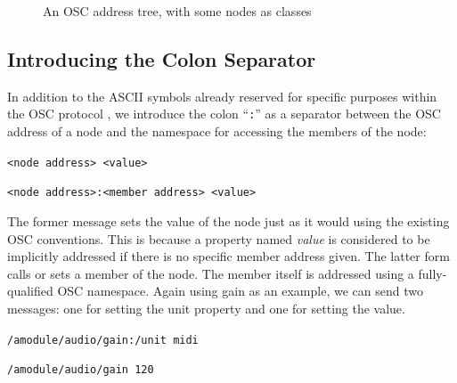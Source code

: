 \documentclass{NIME-alternate}
\begin{document}
\begin{figure}
\centerline{}
\caption{An OSC address tree, with some nodes as classes}
\label{fig:paths}
\end{figure}



\subsection{Introducing the Colon Separator} %
\label{sub:the_colon_separator}

In addition to the ASCII symbols already reserved for specific purposes within the OSC protocol \cite{Wright:1997}, we introduce the colon ``\texttt{:}'' as a separator between the OSC address of a node and the namespace for accessing the members of the node:

\texttt{<node address> <value>}

\texttt{<node address>:<member address> <value>}

The former message sets the value of the node just as it would using the existing OSC conventions. This is because a property named \emph{value} is considered to be implicitly addressed if there is no specific member address given. The latter form calls or sets a member of the node.  The member itself is addressed using a fully-qualified OSC namespace. Again using gain as an example, we can send two messages: one for setting the unit property and one for setting the value.

\texttt{/amodule/audio/gain:/unit midi}

\texttt{/amodule/audio/gain 120}

\end{document}
